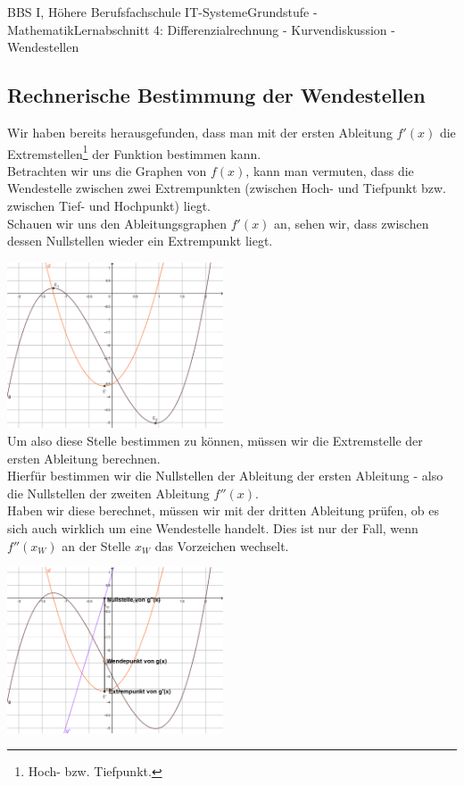 \documentclass[11pt,twocolumn,oneside,openany,headings=optiontotoc,11pt,numbers=noenddot]{article}
\begin{document}
\begin{worksheet}{BBS I, Höhere Berufsfachschule IT-Systeme}{Grundstufe - Mathematik}{Lernabschnitt 4: Differenzialrechnung - Kurvendiskussion - Wendestellen}
		\subsection*{Rechnerische Bestimmung der Wendestellen}
		Wir haben bereits herausgefunden, dass man mit der ersten Ableitung \(f'(x)\) die Extremstellen\footnote{Hoch- bzw. Tiefpunkt.} der Funktion bestimmen kann.\\
		Betrachten wir uns die Graphen von \(f(x)\), kann man vermuten, dass die Wendestelle zwischen zwei Extrempunkten (zwischen Hoch- und Tiefpunkt bzw. zwischen Tief- und Hochpunkt) liegt.\\
		Schauen wir uns den Ableitungsgraphen \(f'(x)\) an, sehen wir, dass zwischen dessen Nullstellen wieder ein Extrempunkt liegt.\\
		\par\noindent
		\includegraphics[width=0.48\textwidth]{../99_Bilder/045_WS_Einf.png}\\
		Um also diese Stelle bestimmen zu können, müssen wir die Extremstelle der ersten Ableitung berechnen.\\
		Hierfür bestimmen wir die Nullstellen der Ableitung der ersten Ableitung - also die Nullstellen der zweiten Ableitung \(f''(x)\).\\
		Haben wir diese berechnet, müssen wir mit der dritten Ableitung prüfen, ob es sich auch wirklich um eine Wendestelle handelt. Dies ist nur der Fall, wenn \(f''(x_W)\) an der Stelle \(x_W\) das Vorzeichen wechselt.\\
		\par\noindent
		\includegraphics[width=0.48\textwidth]{../99_Bilder/045_WS_VZW.png}

\end{worksheet}
\end{document}
